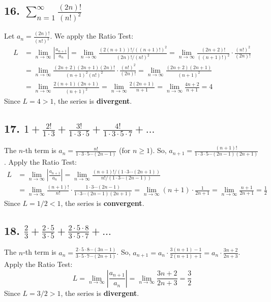 \documentclass{article}
\begin{document}
\subsection*{16. $\sum_{n=1}^{\infty} \frac{(2n)!}{(n!)^2}$}
Let $a_n = \frac{(2n)!}{(n!)^2}$. We apply the Ratio Test:
\begin{align*}
L &= \lim_{n \to \infty} \left| \frac{a_{n+1}}{a_n} \right| = \lim_{n \to \infty} \frac{(2(n+1))!/((n+1)!)^2}{(2n)!/(n!)^2} = \lim_{n \to \infty} \frac{(2n+2)!}{((n+1)!)^2} \cdot \frac{(n!)^2}{(2n)!} \\
&= \lim_{n \to \infty} \frac{(2n+2)(2n+1)(2n)!}{(n+1)^2(n!)^2} \cdot \frac{(n!)^2}{(2n)!} = \lim_{n \to \infty} \frac{(2n+2)(2n+1)}{(n+1)^2} \\
&= \lim_{n \to \infty} \frac{2(n+1)(2n+1)}{(n+1)^2} = \lim_{n \to \infty} \frac{2(2n+1)}{n+1} = \lim_{n \to \infty} \frac{4n+2}{n+1} = 4
\end{align*}
Since $L = 4 > 1$, the series is \textbf{divergent}.

\subsection*{17. $1 + \frac{2!}{1 \cdot 3} + \frac{3!}{1 \cdot 3 \cdot 5} + \frac{4!}{1 \cdot 3 \cdot 5 \cdot 7} + \dots$}
The $n$-th term is $a_n = \frac{n!}{1 \cdot 3 \cdot 5 \cdots (2n-1)}$ (for $n \ge 1$).
So, $a_{n+1} = \frac{(n+1)!}{1 \cdot 3 \cdot 5 \cdots (2n-1)(2n+1)}$.
Apply the Ratio Test:
\begin{align*}
L &= \lim_{n \to \infty} \left| \frac{a_{n+1}}{a_n} \right| = \lim_{n \to \infty} \frac{(n+1)!/(1 \cdot 3 \cdots (2n+1))}{n!/(1 \cdot 3 \cdots (2n-1))} \\
&= \lim_{n \to \infty} \frac{(n+1)!}{n!} \cdot \frac{1 \cdot 3 \cdots (2n-1)}{1 \cdot 3 \cdots (2n-1)(2n+1)} = \lim_{n \to \infty} (n+1) \cdot \frac{1}{2n+1} = \lim_{n \to \infty} \frac{n+1}{2n+1} = \frac{1}{2}
\end{align*}
Since $L = 1/2 < 1$, the series is \textbf{convergent}.

\subsection*{18. $\frac{2}{3} + \frac{2 \cdot 5}{3 \cdot 5} + \frac{2 \cdot 5 \cdot 8}{3 \cdot 5 \cdot 7} + \dots$}
The $n$-th term is $a_n = \frac{2 \cdot 5 \cdot 8 \cdots (3n-1)}{3 \cdot 5 \cdot 7 \cdots (2n+1)}$.
So, $a_{n+1} = a_n \cdot \frac{3(n+1)-1}{2(n+1)+1} = a_n \cdot \frac{3n+2}{2n+3}$.
Apply the Ratio Test:
\[ L = \lim_{n \to \infty} \left| \frac{a_{n+1}}{a_n} \right| = \lim_{n \to \infty} \frac{3n+2}{2n+3} = \frac{3}{2} \]
Since $L = 3/2 > 1$, the series is \textbf{divergent}.
\end{document}

